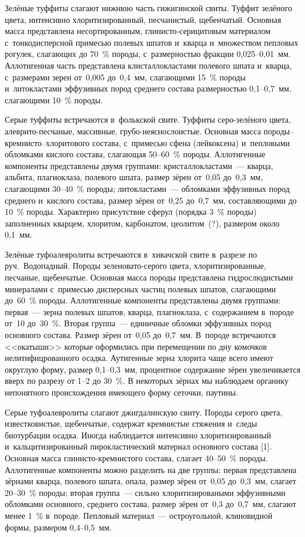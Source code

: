 Зелёные туффиты слагают нижнюю часть гижигинской свиты. Туффит зелёного цвета, интенсивно хлоритизированный, песчанистый, щебенчатый. Основная масса представлена несортированным, глинисто-серицитовым материалом с~тонкодисперсной примесью полевых шпатов и~кварца и~множеством пепловых рогулек, слагающих до 70~\% породы, с~размерностью фракции 0,025--0,01~мм. Аллотигенная часть представлена клисталлокластами полевого шпата и~кварца, с~размерами зерен от~0,005 до~0,4~мм, слагающими 15~\% породы и~литокластами эффузивных пород среднего состава размерностью 0,1--0,7~мм, слагающими 10~\% породы.

Серые туффиты встречаются в~фолькской свите. Туффиты серо-зелёного цвета, алеврито-песчаные, массивные, грубо-неяснослоистые. Основная масса породы--кремнисто–хлоритового состава, с~примесью сфена (лейкоксена) и~пепловыми обломками кислого состава, слагающая 50--60~\% породы. Аллотигенные компоненты представлены двумя группами: кристаллокластами~--- кварца, альбита, плагиоклаза, полевого шпата, размер зёрен от~0,05 до~0,3~мм, слагающими 30--40~\% породы; литокластами~--- обломками эффузивных пород среднего и~кислого состава, размер зёрен от~0,25 до~0,7~мм, составляющими до 10~\% породы. Характерно присутствие сферул (порядка 3~\% породы) заполненных кварцем, хлоритом, карбонатом, цеолитом~(?), размером около 0,1~мм.

Зелёные туфоалевролиты встречаются в~хивачской свите в~разрезе по руч.~Водопадный. Породы зеленовато-серого цвета, хлоритизированные, песчаные, щебенчатые. Основная масса породы представлена гидрослюдистыми минералами с~примесью дисперсных частиц полевых шпатов, слагающими до~60~\% породы. Аллотигенные компоненты представлены двумя группами: первая~--- зерна полевых шпатов, кварца, плагиоклаза, с~содержанием в~породе от~10 до~30~\%. Вторая группа~--- единичные обломки эффузивных пород основного состава. Размер зёрен от~0,05 до~0,7~мм. В~породе встречаются <<окатыши>> которые оформились при перемещении по дну комочков нелитифицрованного осадка. Аутигенные зерна хлорита чаще всего имеют округлую форму, размер 0,1--0,3~мм, процентное содержание зёрен увеличивается вверх по разрезу от 1--2 до 30~\%. В некоторых зёрнах мы наблюдаем органику непонятного происхождения имеющего форму сеточки, паутины.

Серые туфоалевролиты слагают джигдалинскую свиту. Породы серого цвета, известковистые, щебенчатые, содержат кремнистые стяжения и~следы биотурбации осадка. Иногда наблюдается интенсивно хлоритизированный и~кальцитизированный пирокластический материал основного состава [1]. Основная масса глинисто-кремнистого состава, слагает 40--50~\% породы. Аллотигенные компоненты можно разделить на две группы: первая представлена зёрнами кварца, полевого шпата, опала, размер зёрен от~0,05 до~0,3~мм, слагает 20--30~\% породы; вторая группа~--- сильно хлоритизироваными эффузивными обломками основного, среднего состава, размер зёрен от~0,3 до~0,7~мм, слагают менее 1~\% в~породе. Пепловый материал~--- остроугольной, клиновидной формы, размером 0,4--0,5~мм.

